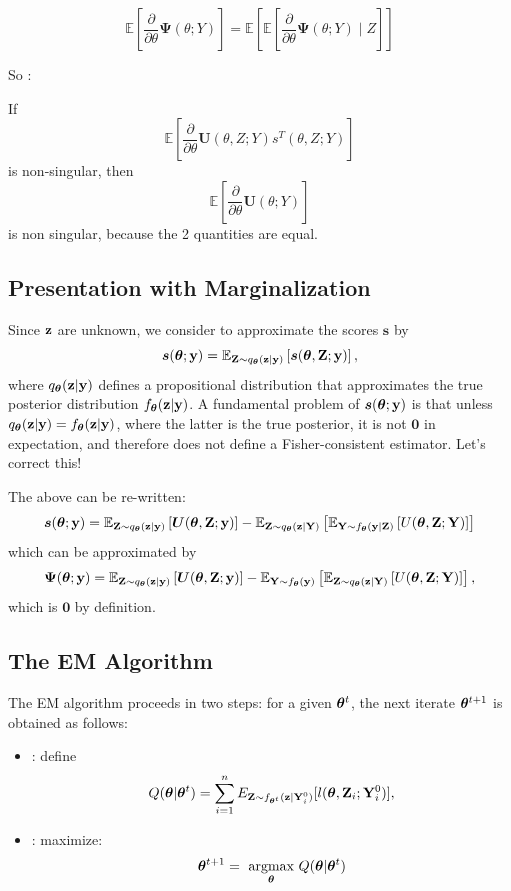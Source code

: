 \documentclass[twoside,11pt]{article}
\newcommand{\E}{{\mathbb{E}}}
\begin{document}
$$ \E[\frac{\partial}{\partial \theta}\bm \Psi(\theta; Y) ] = \E[\E[\frac{\partial}{\partial \theta}\bm \Psi(\theta; Y)\mid Z ]]$$



So : 

If $$ \E[\frac{\partial}{\partial \theta}\bm U(\theta, Z; Y) s^T(\theta, Z; Y)]$$ is non-singular, then $$ \E[\frac{\partial}{\partial \theta}\bm U(\theta; Y) ]$$ is non singular, because the 2 quantities are equal.


\subsection{Presentation with Marginalization}
Since ${\bf z}$ are unknown, we consider to approximate the scores $\bm s$ by
%
\begin{equation}
 \bm s(\bt; \y) = \E_{\Z\sim q_\bt(\z|\y)}\left[\bm s(\bt, \Z; \y)\right],
\end{equation}
%
where $q_{\bm{\theta}}({\bf z}|{\bf y})$ defines a propositional distribution that approximates the true posterior distribution $f_{\bm{\theta}}({\bf z}|{\bf y})$. A fundamental problem of $\bm s({\bm{\theta}}; {\bf y})$ is that unless $q_{\bm{\theta}}({\bf z}|{\bf y}) = f_{\bm{\theta}}({\bf z}|{\bf y})$, where the latter is the true posterior, it is not $\bm 0$ in expectation, and therefore does not define a Fisher-consistent estimator. Let's correct this!

The above can be re-written:
\begin{equation}
 \bm s(\bt; \y) = \E_{\Z\sim q_\bt(\z|\y)}\left[\bm U(\bt, \Z;\y)\right] - \E_{\Z\sim q_\bt(\z|\Y)}\left[\E_{\Y\sim f_\bt(\y|\Z)}\left[U(\bt, \Z;\Y)\right]\right]
\end{equation}
%
which can be approximated by
%
\begin{equation}
 \bm \Psi(\bt; \y) = \E_{\Z\sim q_\bt(\z|\y)}\left[\bm U(\bt, \Z;\y)\right] - \E_{\Y\sim f_\bt(\y)}\left[\E_{\Z\sim q_\bt(\z|\Y)}\left[U(\bt, \Z;\Y)\right]\right],
\end{equation}
%
which is $\bm 0 $ by definition.


\subsection{The EM Algorithm}
The EM algorithm proceeds in two steps: for a given ${\bm{\theta}}^t$, the next iterate ${\bm{\theta}}^{t+1}$ is obtained as follows:

\begin{itemize}
    \item [E-step]: define
    \begin{equation}
        Q({\bm{\theta}} | {\bm{\theta}}^t) = \sum_{i=1}^n E_{{\bf Z}\sim f_{{\bm{\theta}}^{t}}({\bf z}|{\bf Y}_i^0)}[l({\bm{\theta}}, {\bf Z}_i;{\bf Y}_i^0)],
        \label{eqn:E-step}
    \end{equation}
    \item [M-step]: maximize:
    \begin{equation}
        {\bm{\theta}}^{t+1} = \underset{{\bm{\theta}}}{\text{ argmax }} Q({\bm{\theta}}|{\bm{\theta}}^t)
        \label{eqn:M-step}
    \end{equation}
\end{itemize}
\end{document}
